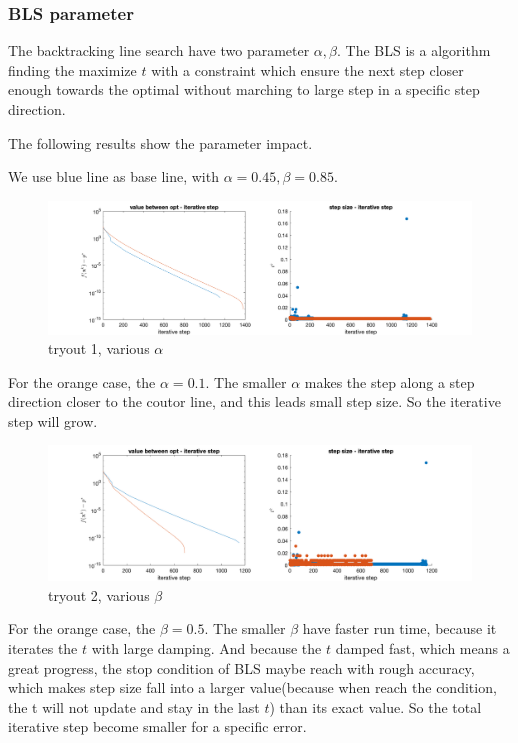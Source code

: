 \documentclass[]{article}
\begin{document}
\subsubsection{BLS parameter}
The backtracking line search have two parameter $\alpha, \beta$. The BLS is a algorithm finding the maximize $t$ with a constraint which ensure the next step closer enough towards the optimal without marching to large step in a specific step direction.
\par The following results show the parameter impact.
\par We use blue line as base line, with \color{red} \textbf{$\alpha = 0.45, \beta = 0.85$}.\color{black}
\begin{figure}[H]
	\centering
	\includegraphics[width=350pt,keepaspectratio]{ga1_45_b85}
	\caption{tryout 1, various  $\alpha$}
\end{figure}
For the orange case, the $\alpha = 0.1$. The smaller $\alpha$ makes the step along a step direction closer to the  coutor line, and this leads small step size. So the iterative step will grow.

\begin{figure}[H]
	\centering
	\includegraphics[width=350pt,keepaspectratio]{ga45_b5_85}
	\caption{tryout 2, various $\beta$}
\end{figure}
For the orange case, the $\beta = 0.5$. The smaller $\beta$ have faster run time, because it iterates the $t$  with large damping. And because the $t $ damped fast, which means a great progress, the stop condition of BLS maybe reach with rough accuracy, which makes step size fall into a larger value(because when reach the condition, the t will not update and stay in the last $t$) than its exact value. So the total iterative step become smaller for a specific error.
\end{document}
